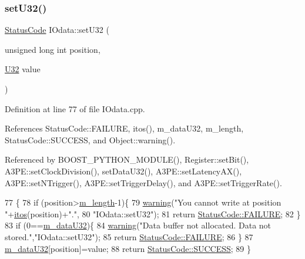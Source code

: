 \subsubsection{\texorpdfstring{set\+U32()}{setU32()}}
{\footnotesize\ttfamily \hyperlink{classStatusCode}{Status\+Code} I\+Odata\+::set\+U32 (\begin{DoxyParamCaption}\item[{unsigned long int}]{position,  }\item[{\hyperlink{classIOdata_a96fb57f5fcd87b708743abd3c86a5198}{U32}}]{value }\end{DoxyParamCaption})}



Definition at line 77 of file I\+Odata.\+cpp.



References Status\+Code\+::\+F\+A\+I\+L\+U\+RE, itos(), m\+\_\+data\+U32, m\+\_\+length, Status\+Code\+::\+S\+U\+C\+C\+E\+SS, and Object\+::warning().



Referenced by B\+O\+O\+S\+T\+\_\+\+P\+Y\+T\+H\+O\+N\+\_\+\+M\+O\+D\+U\+L\+E(), Register\+::set\+Bit(), A3\+P\+E\+::set\+Clock\+Division(), set\+Data\+U32(), A3\+P\+E\+::set\+Latency\+A\+X(), A3\+P\+E\+::set\+N\+Trigger(), A3\+P\+E\+::set\+Trigger\+Delay(), and A3\+P\+E\+::set\+Trigger\+Rate().


\begin{DoxyCode}
77                                                               \{
78   \textcolor{keywordflow}{if} (position>\hyperlink{classIOdata_afabe57441da019eb614d277799106aac}{m\_length}-1)\{
79     \hyperlink{classObject_a65cd4fda577711660821fd2cd5a3b4c9}{warning}(\textcolor{stringliteral}{"You cannot write at position "}+\hyperlink{Tools_8h_af330027dbdafb9a30768b3613c553e60}{itos}(position)+\textcolor{stringliteral}{"."},
80         \textcolor{stringliteral}{"IOdata::setU32"});
81     \textcolor{keywordflow}{return} \hyperlink{classStatusCode_a6f565cbeadc76d14c72f047e5e85eb4ba3da73d4c469762eb9d3c960368252b26}{StatusCode::FAILURE};
82   \}
83   \textcolor{keywordflow}{if} (0==\hyperlink{classIOdata_a247cdaefd87084e3cad1d530d592d99a}{m\_dataU32})\{
84     \hyperlink{classObject_a65cd4fda577711660821fd2cd5a3b4c9}{warning}(\textcolor{stringliteral}{"Data buffer not allocated. Data not stored."},\textcolor{stringliteral}{"IOdata::setU32"});
85     \textcolor{keywordflow}{return} \hyperlink{classStatusCode_a6f565cbeadc76d14c72f047e5e85eb4ba3da73d4c469762eb9d3c960368252b26}{StatusCode::FAILURE};
86   \}
87   \hyperlink{classIOdata_a247cdaefd87084e3cad1d530d592d99a}{m\_dataU32}[position]=value;
88   \textcolor{keywordflow}{return} \hyperlink{classStatusCode_a6f565cbeadc76d14c72f047e5e85eb4badd0da38d3ba0d922efd1f4619bc37ad8}{StatusCode::SUCCESS};
89 \}
\end{DoxyCode}
\mbox{\label{classIOdata_a6c4fb2f2af01889ada889c2b7aceb24d}} 
